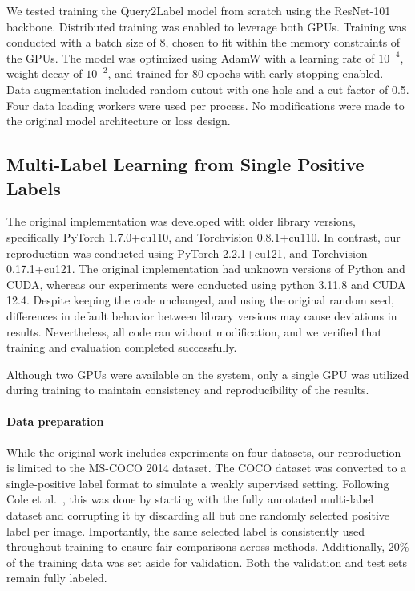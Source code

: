\documentclass[lettersize,journal]{IEEEtran}
\begin{document}
We tested training the Query2Label model from scratch using the ResNet-101 backbone. Distributed training was enabled to leverage both GPUs. Training was conducted with a batch size of 8, chosen to fit within the memory constraints of the GPUs. The model was optimized using AdamW with a learning rate of $10^{-4}$, weight decay of $10^{-2}$, and trained for 80 epochs with early stopping enabled. Data augmentation included random cutout with one hole and a cut factor of 0.5. Four data loading workers were used per process. No modifications were made to the original model architecture or loss design.


\subsection{Multi-Label Learning from Single Positive Labels}
The original implementation was developed with older library versions, specifically PyTorch 1.7.0+cu110, and Torchvision 0.8.1+cu110. In contrast, our reproduction was conducted using PyTorch 2.2.1+cu121, and Torchvision 0.17.1+cu121. The original implementation had unknown versions of Python and CUDA, whereas our experiments were conducted using python 3.11.8 and CUDA 12.4. Despite keeping the code unchanged, and using the original random seed, differences in default behavior between library versions may cause deviations in results. Nevertheless, all code ran without modification, and we verified that training and evaluation completed successfully.

Although two GPUs were available on the system, only a single GPU was utilized during training to maintain consistency and reproducibility of the results.

\paragraph{Data preparation}
While the original work includes experiments on four datasets, our reproduction is limited to the MS-COCO 2014 dataset. The COCO dataset was converted to a single-positive label format to simulate a weakly supervised setting. Following Cole et al.~\cite{mlsp}, this was done by starting with the fully annotated multi-label dataset and corrupting it by discarding all but one randomly selected positive label per image. Importantly, the same selected label is consistently used throughout training to ensure fair comparisons across methods. Additionally, 20\% of the training data was set aside for validation. Both the validation and test sets remain fully labeled.
\end{document}
